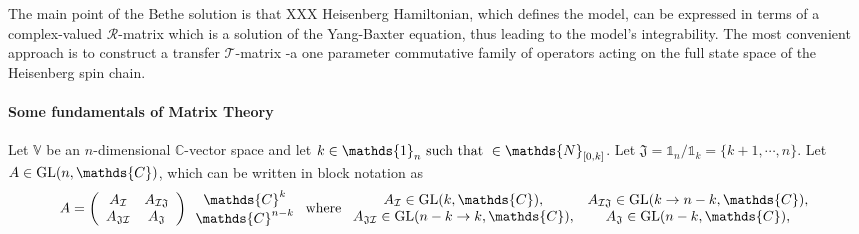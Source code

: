\documentclass{homework}
\begin{document}
The main point of the Bethe solution is that XXX Heisenberg Hamiltonian, which defines the model, can be expressed in terms of a complex-valued $\bm{\mathcal R}$-matrix which is a solution of the Yang-Baxter equation, thus leading to the model's integrability. The most convenient approach is to construct a transfer $\bm{\mathcal{T}}$-matrix -a one parameter commutative family of operators acting on the full state space of the Heisenberg spin chain. \\

\paragraph{\textbf{Some fundamentals of Matrix Theory}}

Let $\mathds{V}$ be an $n$-dimensional $\mathds{C}$-vector space and let $k \in \mathds{1}_n \textnormal{ such that } \in \mathds{N}_{[0, k]}$. Let $\mathfrak{J} = \mathds{1}_n / \mathds{1}_k = \{k+1,\cdots, n\}$. Let $A \in \textnormal{GL}(n, \mathds{C})$, which can be written in block notation as 
\begin{equation}
    A = \left(\begin{array}{cc}
        A_{\mathcal{I}} & A_{\mathcal{I} \mathfrak{J}}  \\
        A_{\mathfrak{J} \mathcal{I}} & A_{\mathfrak{J}}
    \end{array}\right) \begin{array}{c}
         \mathds{C}^k  \\
         \mathds{C}^{n-k}
    \end{array} \textnormal{ where } \begin{array}{cc}
        A_{\mathcal{I}} \in \textnormal{GL}(k, \mathds{C}),  &  A_{\mathcal{I} \mathfrak{J}} \in \textnormal{GL}(k \rightarrow n-k, \mathds{C}), \\
        A_{\mathfrak{J} \mathcal{I}} \in  \textnormal{GL}(n-k \rightarrow k, \mathds{C}), & A_{\mathfrak{J}}  \in \textnormal{GL}(n-k, \mathds{C}),
    \end{array} 
\end{equation}
\end{document}
